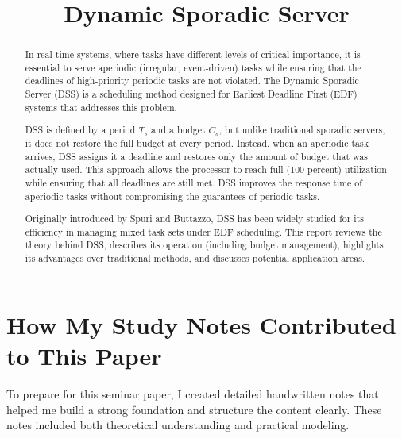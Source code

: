\documentclass[conference]{IEEEtran}
\begin{document}
\title{ Dynamic Sporadic Server\\

}

\author{

}

\maketitle

\begin{abstract}
In real-time systems, where tasks have different levels of critical importance, it is essential to serve aperiodic (irregular, event-driven) tasks while ensuring that the deadlines of high-priority periodic tasks are not violated. The Dynamic Sporadic Server (DSS) is a scheduling method designed for Earliest Deadline First (EDF) systems that addresses this problem. 

DSS is defined by a period  $T_s$ and a budget $C_s$, but unlike traditional sporadic servers, it does not restore the full budget at every period. Instead, when an aperiodic task arrives, DSS assigns it a deadline and restores only the amount of budget that was actually used. This approach allows the processor to reach full (100 percent) utilization while ensuring that all deadlines are still met. DSS improves the response time of aperiodic tasks without compromising the guarantees of periodic tasks.

Originally introduced by Spuri and Buttazzo\cite{spuri1994efficient}, DSS has been widely studied for its efficiency in managing mixed task sets under EDF scheduling. This report reviews the theory behind DSS, describes its operation (including budget management), highlights its advantages over traditional methods, and discusses potential application areas.
 
\end{abstract}
\section*{How My Study Notes Contributed to This Paper}

To prepare for this seminar paper, I created detailed handwritten notes that helped me build a strong foundation and structure the content clearly. These notes included both theoretical understanding and practical modeling.
\end{document}
